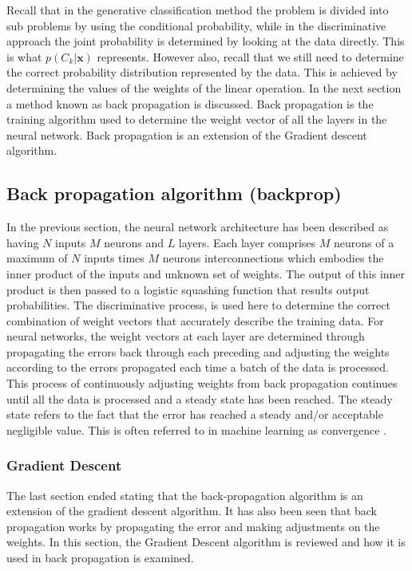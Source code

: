 Recall that in the generative classification method the problem is divided into sub problems by using the conditional probability, while in the discriminative approach the joint probability is determined by looking at the data directly.  This is what $p(C_k|\mathbf{x})$ represents.  However also, recall that we still need to determine the correct probability distribution represented by the data.  This is achieved by determining the values of the weights of the linear operation.  In the next section a method known as back propagation is discussed.  Back propagation is the training algorithm used to determine the weight vector of all the layers in the neural network.  Back propagation is an extension of the Gradient descent algorithm.

\subsection{Back propagation algorithm (backprop)}
In the previous section, the neural network architecture has been described as having $N$ inputs $M$ neurons and $L$ layers. Each layer comprises $M$ neurons of a maximum of $N$ inputs times $M$ neurons interconnections which embodies the inner product of the inputs and unknown set of weights. The output of this inner product is then passed to a logistic squashing function that results output probabilities.  The discriminative process, is used here to determine the correct combination of weight vectors that accurately describe the training data.  For neural networks, the weight vectors at each layer are determined through propagating the errors back through each preceding and adjusting the weights according to the errors propagated each time a batch of the data is processed.  This process of continuously adjusting weights from back propagation continues until all the data is processed and a steady state has been reached.  The steady state refers to the fact that the error has reached a steady and/or acceptable negligible value.  This is often referred to in machine learning as convergence \citep{boden2002guide}.

\subsubsection{Gradient Descent}
The last section ended stating that the back-propagation algorithm is an extension of the gradient descent algorithm.  It has also been seen that back propagation works by propagating the error and making adjustments on the weights.  In this section, the Gradient Descent algorithm is reviewed and how it is used in back propagation is examined.  

